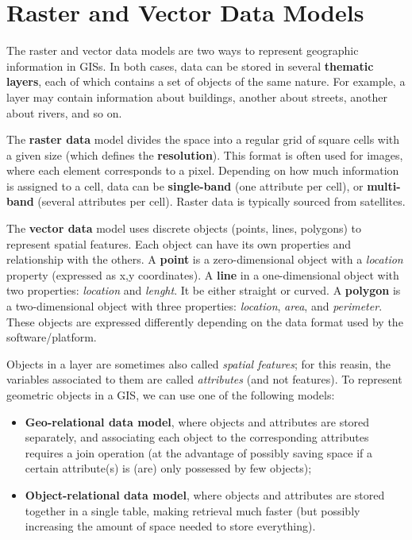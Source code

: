 \section{Raster and Vector Data Models}

The raster and vector data models are two ways to represent geographic information in GISs. In both cases, data can be stored in several \textbf{thematic layers}, each of which contains a set of objects of the same nature. For example, a layer may contain information about buildings, another about streets, another about rivers, and so on.

The \textbf{raster data} model divides the space into a regular grid of square cells with a given size (which defines the \textbf{resolution}). This format is often used for images, where each element corresponds to a pixel. Depending on how much information is assigned to a cell, data can be \textbf{single-band} (one attribute per cell), or \textbf{multi-band} (several attributes per cell). Raster data is typically sourced from satellites.

The \textbf{vector data} model uses discrete objects (points, lines, polygons) to represent spatial features. Each object can have its own properties and relationship with the others. A \textbf{point} is a zero-dimensional object with a \textit{location} property (expressed as x,y coordinates). A \textbf{line} in a one-dimensional object with two properties: \textit{location} and \textit{lenght}. It be either straight or curved. A \textbf{polygon} is a two-dimensional object with three properties: \textit{location}, \textit{area}, and \textit{perimeter}. These objects are expressed differently depending on the data format used by the software/platform.

Objects in a layer are sometimes also called \textit{spatial features}; for this reasin, the variables associated to them are called \textit{attributes} (and not features). To represent geometric objects in a GIS, we can use one of the following models:
\begin{itemize}
    \item \textbf{Geo-relational data model}, where objects and attributes are stored separately, and associating each object to the corresponding attributes requires a join operation (at the advantage of possibly saving space if a certain attribute(s) is (are) only possessed by few objects);
    \item \textbf{Object-relational data model}, where objects and attributes are stored together in a single table, making retrieval much faster (but possibly increasing the amount of space needed to store everything). 
\end{itemize}

